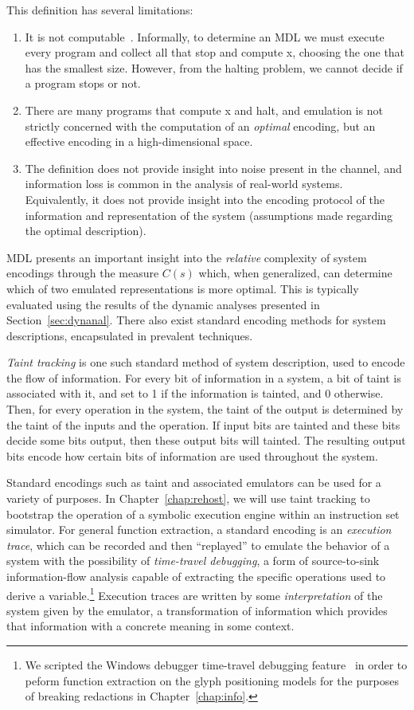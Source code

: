 \noindent
This definition has several limitations:
\begin{enumerate}
	\item It is not computable~\cite{cover1999elements}. Informally, to determine an
		MDL we must execute every program and collect all that stop and
		compute x, choosing the one that has the smallest size.
		However, from the halting problem, we cannot decide if a
		program stops or not. 
	\item There are many programs that compute x and halt, and emulation is
		not strictly concerned with the computation of an
		\emph{optimal} encoding, but an effective encoding in a
		high-dimensional space.
	\item The definition does not provide insight into noise present in the
		channel, and information loss is common in the analysis of real-world
		systems. Equivalently, it does not provide insight into the encoding protocol
		of the information and representation of the system (assumptions made regarding
		the optimal description).
\end{enumerate}

MDL presents an important insight into the \emph{relative} complexity of system encodings through the measure $C(s)$ which, when generalized, can determine which of two emulated representations is more optimal.
This is typically evaluated using the results of the dynamic analyses presented in Section~\ref{sec:dynanal}.
There also exist standard encoding methods for system descriptions, encapsulated in prevalent techniques.

\emph{Taint tracking} is one such standard method of system description, used to encode the flow of information.
For every bit of information in a system, a bit of taint is associated with it, and set to 1 if the information is tainted, and 0 otherwise.
Then, for every operation in the system, the taint of the output is determined by the taint of the inputs and the operation.
If input bits are tainted and these bits decide some bits output, then these output bits will tainted.
The resulting output bits encode how certain bits of information are used throughout the system.

Standard encodings such as taint and associated emulators can be used for a variety of purposes.
In Chapter~\ref{chap:rehost}, we will use taint tracking to bootstrap the operation of a symbolic execution engine within an instruction set simulator.
For general function extraction, a standard encoding is an \emph{execution trace}, which can be recorded and then ``replayed'' to emulate the behavior of a system with the possibility of \emph{time-travel debugging}, a form of source-to-sink information-flow analysis capable of extracting the specific operations used to derive a variable.\footnote{
	We scripted the Windows debugger time-travel debugging feature~\cite{timetravel} in order to peform function extraction on the glyph positioning models for the purposes of breaking redactions in Chapter~\ref{chap:info}.}
Execution traces are written by some \emph{interpretation} of the system given by the emulator, a transformation of information which provides that information with a concrete meaning in some context.


